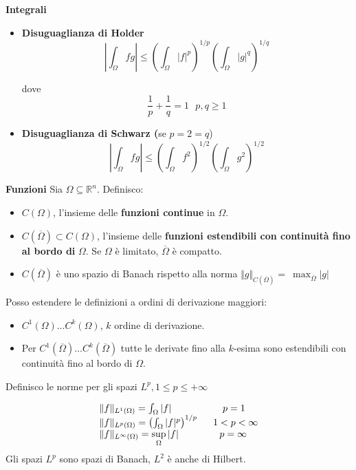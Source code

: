 \documentclass[10pt,a4paper,twoside,openright]{book}
\begin{document}
\textbf{Integrali}
\begin{itemize}
\item \textbf{Disuguaglianza di Holder}
\begin{equation*}
\left| \int _{\Omega } fg\right| \leqslant \left(\int _{\Omega }| f| ^{p}\right)^{1/p}\left(\int _{\Omega }| g| ^{q}\right)^{1/q}
\end{equation*}

dove \begin{equation*}
\frac{1}{p} +\frac{1}{q} =1\ \ \ p,q\geqslant 1
\end{equation*}
\item \textbf{Disuguaglianza di Schwarz (}se $p=2=q$) \begin{equation*}
\left| \int _{\Omega } fg\right| \leqslant \left(\int _{\Omega } f^{2}\right)^{1/2}\left(\int _{\Omega } g^{2}\right)^{1/2}
\end{equation*}
\end{itemize}

\textbf{Funzioni}
Sia $\Omega \subseteq \mathbb{R}^{n}$. Definisco:
\begin{itemize}
	\item $C(\Omega)$, l'insieme delle \textbf{funzioni continue} in $\Omega $.
	\item $C(\overline{\Omega }) \subset C(\Omega)$, l'insieme delle \textbf{funzioni estendibili con continuità fino al bordo di} $\Omega $. Se $\Omega $ è limitato, $\overline{\Omega }$ è compatto. 
	\item $C(\overline{\Omega })$ è uno spazio di Banach rispetto alla norma $\Vert g\Vert _{C(\overline{\Omega })} =\ \max_{\overline{\Omega }}| g| $
\end{itemize}

Posso estendere le definizioni a ordini di derivazione maggiori:
\begin{itemize}
	\item $C^{1}(\Omega) \dotsc C^{k}(\Omega)$, $k$ ordine di derivazione.
	\item Per $C^{1}(\overline{\Omega }) \dotsc C^{k}(\overline{\Omega })$ tutte le derivate fino alla $k$-esima sono estendibili con continuità fino al bordo di $\displaystyle \Omega $.
\end{itemize}

Definisco le norme per gli spazi $L^{p},1\leqslant p\leqslant +\infty $

\begin{equation*}
\begin{array}{ l l }
\Vert f\Vert _{L^{1}(\Omega)} =\int _{\Omega }| f|  & \ \ \ \ p=1\\
\Vert f\Vert _{L^{p}(\Omega)} =\left(\int _{\Omega }| f| ^{p}\right)^{1/p} \  & \ 1< p< \infty \\
\Vert f\Vert _{L^{\infty }(\Omega)} =\sup\limits _{\Omega }| f|  & \ \ \ p=\infty 
\end{array}
\end{equation*}
Gli spazi $\displaystyle L^{p}$ sono spazi di Banach, $\displaystyle L^{2}$ è anche di Hilbert.
\end{document}
